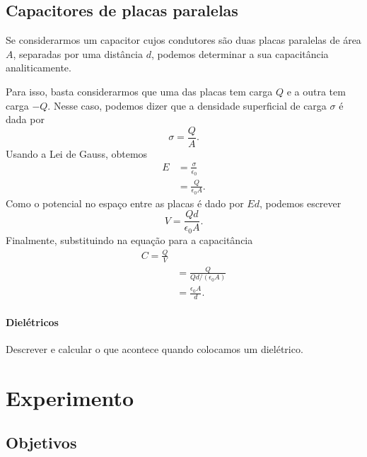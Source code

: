 \subsection{Capacitores de placas paralelas}

Se considerarmos um capacitor cujos condutores são duas placas paralelas de área $A$, separadas por uma distância $d$, podemos determinar a sua capacitância analiticamente.

Para isso, basta considerarmos que uma das placas tem carga $Q$ e a outra tem carga $-Q$. Nesse caso, podemos dizer que a densidade superficial de carga $\sigma$ é dada por
\begin{equation}
	\sigma = \frac{Q}{A}.
\end{equation}
%
Usando a Lei de Gauss, obtemos
\begin{align}
	E &= \frac{\sigma}{\epsilon_0} \\
	&= \frac{Q}{\epsilon_0 A}.
\end{align}
%
Como o potencial no espaço entre as placas é dado por $Ed$, podemos escrever
\begin{equation}
	V = \frac{Qd}{\epsilon_0 A}.
\end{equation}
%
Finalmente, substituindo na equação para a capacitância
\begin{align}
	C = \frac{Q}{V} \\
	&= \frac{Q}{Qd/(\epsilon_0 A)} \\
	&= \frac{\epsilon_0 A}{d}.
\end{align}

\paragraph{Dielétricos}

Descrever e calcular o que acontece quando colocamos um dielétrico.

\section{Experimento}

\subsection{Objetivos}

